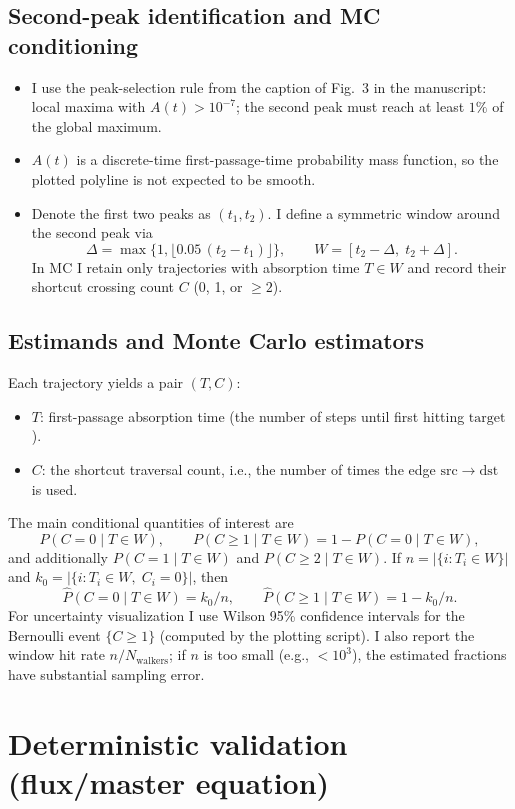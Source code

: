 \documentclass[11pt]{article}
\begin{document}
\subsection{Second-peak identification and MC conditioning}
\begin{itemize}
  \item I use the peak-selection rule from the caption of Fig.~3 in the manuscript: local maxima with $A(t)>10^{-7}$; the second peak must reach at least $1\%$ of the global maximum.
  \item $A(t)$ is a discrete-time first-passage-time probability mass function, so the plotted polyline is not expected to be smooth.
  \item Denote the first two peaks as $(t_1,t_2)$. I define a symmetric window around the second peak via
  \[
    \Delta=\max\{1,\lfloor 0.05\,(t_2-t_1)\rfloor\},\qquad W=[t_2-\Delta,\;t_2+\Delta].
  \]
  In MC I retain only trajectories with absorption time $T\in W$ and record their shortcut crossing count $C$ (0, 1, or $\ge 2$).
\end{itemize}

\subsection{Estimands and Monte Carlo estimators}
Each trajectory yields a pair $(T,C)$:
\begin{itemize}
  \item $T$: first-passage absorption time (the number of steps until first hitting $\mathrm{target}$).
  \item $C$: the shortcut traversal count, i.e., the number of times the edge $\mathrm{src}\to\mathrm{dst}$ is used.
\end{itemize}
The main conditional quantities of interest are
\[
  P(C=0\mid T\in W),\qquad P(C\ge 1\mid T\in W)=1-P(C=0\mid T\in W),
\]
and additionally $P(C=1\mid T\in W)$ and $P(C\ge 2\mid T\in W)$.
If $n=|\{i:T_i\in W\}|$ and $k_0=|\{i:T_i\in W,\;C_i=0\}|$, then
\[
  \widehat{P}(C=0\mid T\in W)=k_0/n,\qquad \widehat{P}(C\ge1\mid T\in W)=1-k_0/n.
\]
For uncertainty visualization I use Wilson 95\% confidence intervals for the Bernoulli event $\{C\ge 1\}$ (computed by the plotting script). I also report the window hit rate $n/N_{\mathrm{walkers}}$; if $n$ is too small (e.g., $<10^3$), the estimated fractions have substantial sampling error.

\section{Deterministic validation (flux/master equation)}

\end{document}
